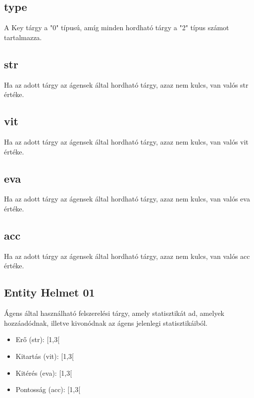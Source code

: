 \subsection{type}

A Key tárgy a "0" típusú, amíg minden hordható tárgy a "2" típus számot tartalmazza.

\subsection{str}

Ha az adott tárgy az ágensek által hordható tárgy, azaz nem kulcs, van valós str értéke.

\subsection{vit}

Ha az adott tárgy az ágensek által hordható tárgy, azaz nem kulcs, van valós vit értéke.

\subsection{eva}

Ha az adott tárgy az ágensek által hordható tárgy, azaz nem kulcs, van valós eva értéke.

\subsection{acc}

Ha az adott tárgy az ágensek által hordható tárgy, azaz nem kulcs, van valós acc értéke.


\subsection{Entity Helmet 01}

Ágens által használható felszerelési tárgy, amely statisztikát ad, amelyek hozzáadódnak, illetve kivonódnak az ágens jelenlegi statisztikáiból.

\begin{itemize}
    \item Erő (str): [1,3[
    \item Kitartás (vit): [1,3[
    \item Kitérés (eva): [1,3[
    \item Pontosság (acc): [1,3[
\end{itemize}

